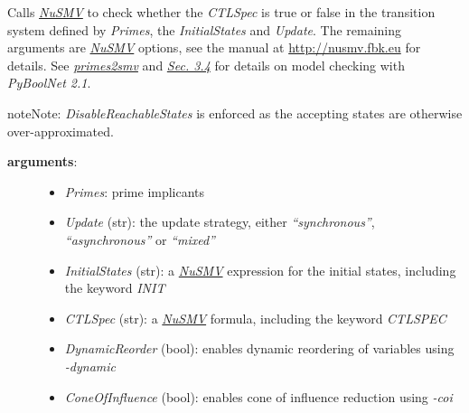 \documentclass[letterpaper,10pt,english]{sphinxmanual}
\begin{document}
\begin{fulllineitems}
\label{ModelChecking:PyBoolNet.ModelChecking.check_primes_with_acceptingstates}
Calls {\hyperref[Installation:installation-nusmv]{\emph{NuSMV}}} to check whether the \emph{CTLSpec} is true or false in the transition system defined by \emph{Primes},
the \emph{InitialStates} and \emph{Update}.
The remaining arguments are {\hyperref[Installation:installation-nusmv]{\emph{NuSMV}}} options, see the manual at \href{http://nusmv.fbk.eu}{http://nusmv.fbk.eu} for details.
See {\hyperref[ModelChecking:primes2smv]{\emph{primes2smv}}} and {\hyperref[Manual:sec-model-checking]{\emph{Sec. 3.4}}} for details on model checking with \emph{PyBoolNet 2.1}.

\begin{notice}{note}{Note:}
\emph{DisableReachableStates} is enforced as the accepting states are otherwise over-approximated.
\end{notice}
\begin{description}
\item[{\textbf{arguments}:}] \leavevmode\begin{itemize}
\item {} 
\emph{Primes}: prime implicants

\item {} 
\emph{Update} (str): the update strategy, either \emph{``synchronous''}, \emph{``asynchronous''} or \emph{``mixed''}

\item {} 
\emph{InitialStates} (str): a {\hyperref[Installation:installation-nusmv]{\emph{NuSMV}}} expression for the initial states, including the keyword \emph{INIT}

\item {} 
\emph{CTLSpec} (str): a {\hyperref[Installation:installation-nusmv]{\emph{NuSMV}}} formula, including the keyword \emph{CTLSPEC}

\item {} 
\emph{DynamicReorder} (bool): enables dynamic reordering of variables using \emph{-dynamic}

\item {} 
\emph{ConeOfInfluence} (bool): enables cone of influence reduction using \emph{-coi}

\end{itemize}


\end{description}
\end{fulllineitems}
\end{document}
